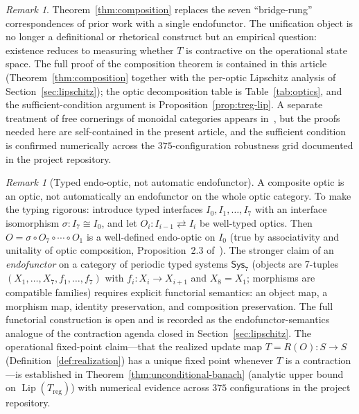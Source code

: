 \documentclass[11pt,a4paper]{article}
\theoremstyle{plain}
\theoremstyle{definition}
\theoremstyle{remark}
\newtheorem{remark}[theorem]{Remark}
\DeclareMathOperator{\Lip}{Lip}
\begin{document}
\begin{remark}
Theorem~\ref{thm:composition} replaces the seven ``bridge-rung''
correspondences of prior work with a single endofunctor. The
unification object is no longer a definitional or rhetorical construct
but an empirical question: existence reduces to measuring whether $T$
is contractive on the operational state space. The full proof of the composition theorem is
contained in this article (Theorem~\ref{thm:composition} together
with the per-optic Lipschitz analysis of
Section~\ref{sec:lipschitz}); the optic decomposition table is
Table~\ref{tab:optics}, and the sufficient-condition argument is
Proposition~\ref{prop:treg-lip}. A separate treatment of
free cornerings of monoidal categories appears
in~\cite{riley2023}, but the proofs needed here are self-contained
in the present article, and the sufficient condition is confirmed
numerically across the $375$-configuration robustness grid
documented in the project repository.
\end{remark}

\begin{remark}[Typed endo-optic, not automatic endofunctor]
\label{rem:typed-optic}
A composite optic is an optic, not automatically an endofunctor on the
whole optic category. To make the typing rigorous: introduce typed
interfaces $I_0, I_1, \ldots, I_7$ with an interface isomorphism
$\sigma : I_7 \cong I_0$, and let $O_i : I_{i-1} \rightleftarrows I_i$
be well-typed optics. Then $O = \sigma \circ O_7 \circ \cdots \circ O_1$
is a well-defined endo-optic on $I_0$ (true by associativity and
unitality of optic composition, Proposition~2.3 of~\cite{riley2018optics}).
The stronger claim of an \emph{endofunctor} on a category of periodic
typed systems $\mathsf{Sys}_7$ (objects are 7-tuples
$(X_1, \ldots, X_7, f_1, \ldots, f_7)$ with $f_i : X_i \to X_{i+1}$
and $X_8 = X_1$; morphisms are compatible families) requires explicit
functorial semantics: an object map, a morphism map, identity
preservation, and composition preservation. The full functorial
construction is open and is recorded as
the endofunctor-semantics analogue of the contraction agenda closed
in Section~\ref{sec:lipschitz}. The operational fixed-point claim---that the
realized update map $T = R(O) : S \to S$ (Definition~\ref{def:realization})
has a unique fixed point whenever $T$ is a contraction---is established
in Theorem~\ref{thm:unconditional-banach} (analytic upper bound on
$\Lip(T_{\mathrm{reg}})$) with numerical
evidence across $375$ configurations in the project repository.
\end{remark}
\end{document}
